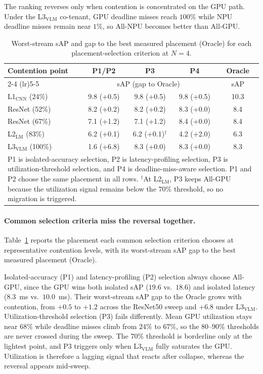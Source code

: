 \documentclass[runningheads]{llncs}
\newcommand{\Lcnn}{L1$_{\text{CNN}}$}
\newcommand{\Llm}{L2$_{\text{LM}}$}
\newcommand{\Lvlm}{L3$_{\text{VLM}}$}
\begin{document}
The ranking reverses only when contention is concentrated on the GPU path. Under the \Lvlm{} co-tenant, GPU deadline misses reach $100\%$ while NPU deadline misses remain near $1\%$, so All-NPU becomes better than All-GPU.


\begin{table}[tbp]
\centering
\caption{Worst-stream sAP and gap to the best measured placement (Oracle) for each placement-selection criterion at $N{=}4$.}
\label{tab:policy-comparison}
\footnotesize
\setlength{\tabcolsep}{7pt}
\begin{tabular}{lcccc}
\toprule
Contention point & P1/P2 & P3 & P4 & Oracle \\
\cmidrule(lr){2-4} \cmidrule(lr){5-5}
 & \multicolumn{3}{c}{sAP (gap to Oracle)} & sAP \\
\midrule
\Lcnn{} (24\%) & 9.8 (+0.5) & 9.8 (+0.5) & 9.8 (+0.5) & 10.3 \\
ResNet (52\%) & 8.2 (+0.2) & 8.2 (+0.2) & 8.3 (+0.0) & 8.4 \\
ResNet (67\%) & 7.1 (+1.2) & 7.1 (+1.2) & 8.4 (+0.0) & 8.4 \\
\Llm{} (83\%) & 6.2 (+0.1) & 6.2 (+0.1)$^\dagger$ & 4.2 (+2.0) & 6.3 \\
\Lvlm{} (100\%) & 1.6 (+6.8) & 8.3 (+0.0) & 8.3 (+0.0) & 8.3 \\
\bottomrule
\multicolumn{5}{p{0.93\linewidth}}{\scriptsize P1 is isolated-accuracy selection, P2 is latency-profiling selection, P3 is utilization-threshold selection, and P4 is deadline-miss-aware selection. P1 and P2 choose the same placement in all rows. $^\dagger$At \Llm{}, P3 keeps All-GPU because the utilization signal remains below the $70\%$ threshold, so no migration is triggered.} \\

\end{tabular}
\end{table}
\paragraph{\textbf{Common selection criteria miss the reversal together.}}
Table~\ref{tab:policy-comparison} reports the placement each common selection criterion chooses at representative contention levels, with its worst-stream sAP gap to the best measured placement (Oracle).

Isolated-accuracy (P1) and latency-profiling (P2) selection always choose All-GPU, since the GPU wins both isolated sAP ($19.6$ vs.\ $18.6$) and isolated latency ($8.3$~ms vs.\ $10.0$~ms). Their worst-stream sAP gap to the Oracle grows with contention, from $+0.5$ to $+1.2$ across the ResNet50 sweep and $+6.8$ under \Lvlm{}.
%
Utilization-threshold selection (P3) fails differently. Mean GPU utilization stays near $68\%$ while deadline misses climb from $24\%$ to $67\%$, so the $80$--$90\%$ thresholds are never crossed during the sweep. The $70\%$ threshold is borderline only at the lightest point, and P3 triggers only when \Lvlm{} fully saturates the GPU. Utilization is therefore a lagging signal that reacts after collapse, whereas the reversal appears mid-sweep.
\end{document}
